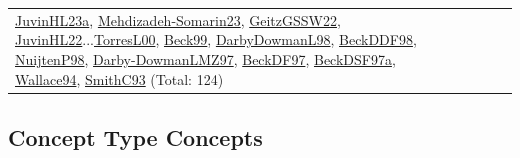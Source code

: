 {\begin{longtable}{p{3cm}r>{\raggedright\arraybackslash}p{6cm}>{\raggedright\arraybackslash}p{6cm}>{\raggedright\arraybackslash}p{8cm}}
\hyperref[detail:JuvinHL23a]{JuvinHL23a}, \hyperref[detail:Mehdizadeh-Somarin23]{Mehdizadeh-Somarin23}, \hyperref[detail:GeitzGSSW22]{GeitzGSSW22}, \hyperref[detail:JuvinHL22]{JuvinHL22}...\hyperref[detail:TorresL00]{TorresL00}, \hyperref[detail:Beck99]{Beck99}, \hyperref[detail:DarbyDowmanL98]{DarbyDowmanL98}, \hyperref[detail:BeckDDF98]{BeckDDF98}, \hyperref[detail:NuijtenP98]{NuijtenP98}, \hyperref[detail:Darby-DowmanLMZ97]{Darby-DowmanLMZ97}, \hyperref[detail:BeckDF97]{BeckDF97}, \hyperref[detail:BeckDSF97a]{BeckDSF97a}, \hyperref[detail:Wallace94]{Wallace94}, \hyperref[detail:SmithC93]{SmithC93} (Total: 124)\\
\end{longtable}
}

\clearpage
\subsection{Concept Type Concepts}
\label{sec:Concepts}
\label{Concepts}
